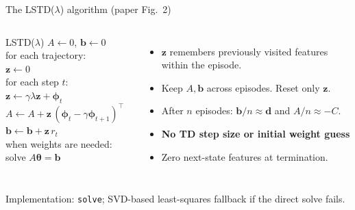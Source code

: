 \documentclass[aspectratio=169,11pt]{beamer}
\newcommand{\memberC}{Member C}
\newcommand{\speaker}[1]{} %
\newcommand{\hl}[1]{\textcolor{accent}{\textbf{#1}}}
\newcommand{\vphi}{\bm{\phi}}
\newcommand{\vz}{\mathbf{z}}
\newcommand{\vth}{\bm{\theta}}
\begin{document}
\begin{frame}{The LSTD($\lambda$) algorithm (paper Fig.~2)}
  \speaker{\memberC}
  \begin{columns}[T]
    \begin{block}{LSTD($\lambda$)}
      \small
      $A \leftarrow 0$, $\mathbf{b} \leftarrow 0$\\
      for each trajectory:\\
      \quad $\vz \leftarrow 0$\\
      \quad for each step $t$:\\
      \qquad $\vz \leftarrow \gamma\lambda\vz + \vphi_t$\\
      \qquad $A \leftarrow A + \vz\,(\vphi_t - \gamma\vphi_{t+1})^\top$\\
      \qquad $\mathbf{b} \leftarrow \mathbf{b} + \vz\, r_t$\\
      when weights are needed: solve $A\vth=\mathbf{b}$
    \end{block}
    \begin{itemize}
      \item $\vz$ remembers previously visited features within the episode.
      \item Keep $A,\mathbf{b}$ across episodes. Reset only $\vz$.
      \item After $n$ episodes: $\mathbf{b}/n\approx\mathbf{d}$ and $A/n\approx-C$.
      \item \hl{No TD step size or initial weight guess}
      \item Zero next-state features at termination.
    \end{itemize}
  \end{columns}
  \vspace{0.3em}
  \small Implementation: \texttt{solve}; SVD-based least-squares fallback if the direct solve fails.
\end{frame}
\end{document}
